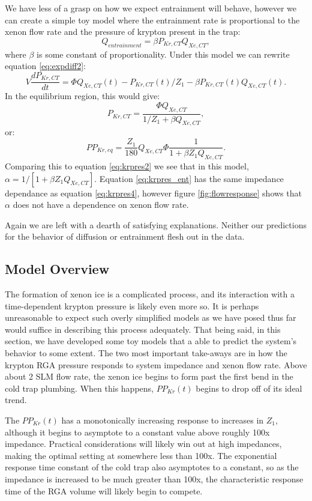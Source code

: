 \documentclass[12pt]{article}
\begin{document}
We have less of a grasp on how we expect entrainment will behave, however we can create a simple toy model where the entrainment rate is proportional to the xenon flow rate and the pressure of krypton present in the trap:
\begin{equation}
Q_{entrainment}=\beta P_{Kr,CT}Q_{Xe,CT},
\end{equation}
where $\beta$ is some constant of proportionality. Under this model we can rewrite equation \ref{eq:expdiff2}:
\begin{equation}
V\frac{dP_{Kr,CT}}{dt}=\Phi Q_{Xe,CT}(t)-P_{Kr,CT}(t)/Z_1-\beta P_{Kr,CT}(t)Q_{Xe,CT}(t).
\end{equation}
In the equilibrium region, this would give:
\begin{equation}
P_{Kr,CT}=\frac{\Phi Q_{Xe,CT}}{1/Z_1+\beta Q_{Xe,CT}},
\end{equation}
or:
\begin{equation}
\label{eq:krpres_ent}
PP_{Kr,eq}=\frac{Z_1}{180}Q_{Xe,CT}\Phi \frac{1}{1+\beta Z_1 Q_{Xe,CT}}.
\end{equation}
Comparing this to equation \ref{eq:krpres2} we see that in this model, $\alpha=1/[1+\beta Z_1 Q_{Xe,CT}]$. Equation \ref{eq:krpres_ent} has the same impedance dependance as equation \ref{eq:krpres4}, however figure \ref{fig:flowresponse} shows that $\alpha$ does not have a dependence on xenon flow rate.

Again we are left with a dearth of satisfying explanations. Neither our predictions for the behavior of diffusion or entrainment flesh out in the data. 


\subsection{Model Overview}
The formation of xenon ice is a complicated process, and its interaction with a time-dependent krypton pressure is likely even more so. It is perhaps unreasonable to expect such overly simplified models as we have posed thus far would suffice in describing this process adequately. That being said, in this section, we have developed some toy models that a able to predict the system's behavior to some extent. The two most important take-aways are in how the krypton RGA pressure responds to system impedance and xenon flow rate. Above about 2 SLM flow rate, the xenon ice begins to form past the first bend in the cold trap plumbing. When this happens, $PP_{Kr}(t)$ begins to drop off of its ideal trend. 

The $PP_{Kr}(t)$ has a monotonically increasing response to increases in $Z_1$, although it begins to asymptote to a constant value above roughly 100x impedance. Practical considerations will likely win out at high impedances, making the optimal setting at somewhere less than 100x. The exponential response time constant of the cold trap also asymptotes to a constant, so as the impedance is increased to be much greater than 100x, the characteristic response time of the RGA volume will likely begin to compete. 
\end{document}
